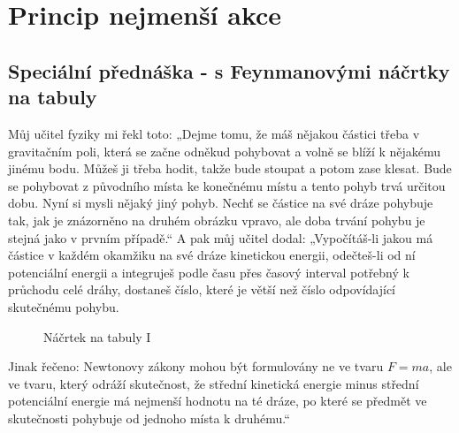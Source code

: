 \setchaptertoc
\chapter{Princip nejmenší akce}\label{fyz:IIchapXIX}


  \section{Speciální přednáška - s Feynmanovými náčrtky na tabuly}\label{fyz:IIchapXIXsecI}
    Můj učitel fyziky mi řekl toto: „Dejme tomu, že máš nějakou částici třeba v gravitačním poli,
    která se začne odněkud pohybovat a volně se blíží k nějakému jinému bodu. Můžeš ji třeba hodit,
    takže bude stoupat a potom zase klesat. Bude se pohybovat z původního místa ke konečnému místu a
    tento pohyb trvá určitou dobu. Nyní si mysli nějaký jiný pohyb. Nechť se částice na své dráze
    pohybuje tak, jak je znázorněno na druhém obrázku vpravo, ale doba trvání pohybu je stejná jako
    v prvním případě.“ A pak můj učitel dodal: „Vypočítáš-li jakou má částice v každém okamžiku na
    své dráze kinetickou energii, odečteš-li od ní potenciální energii a integruješ podle času přes
    časový interval potřebný k průchodu celé dráhy, dostaneš číslo, které je větší než číslo
    odpovídající skutečnému pohybu.

    \begin{figure}[ht!]
      \centering
       \hfill
      \caption{Náčrtek na tabuly I}
      \label{fyz:fig651}
    \end{figure}

    Jinak řečeno: Newtonovy zákony mohou být formulovány ne ve tvaru \(F=ma\), ale ve tvaru, který
    odráží skutečnost, že střední kinetická energie minus střední potenciální energie má nejmenší
    hodnotu na té dráze, po které se předmět ve skutečnosti pohybuje od jednoho místa k druhému.“

